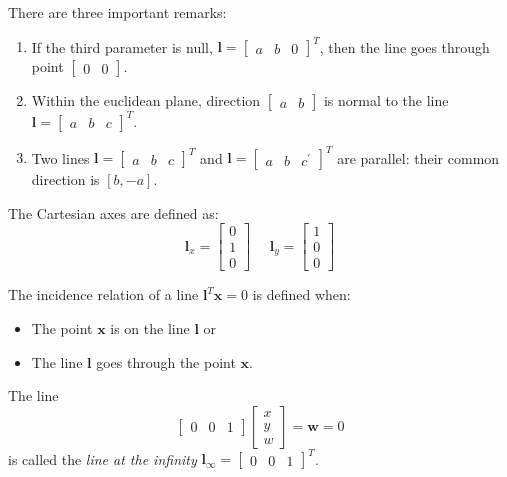 \documentclass[12pt, a4paper]{report}
\newtheorem[style=M,bodystyle=\normalfont]{theorem}{Theorem}
\newtheorem[style=M,bodystyle=\normalfont]{corollary}{Corollary}
\newtheorem[style=M,bodystyle=\normalfont]{lemma}{Lemma}
\newtheorem[style=M,bodystyle=\normalfont]{definition}{Definition}
\begin{document}
    There are three important remarks: 
    \begin{enumerate}
        \item If the third parameter is null, ${\textbf{l}=\begin{bmatrix} a & b & 0 \end{bmatrix}}^T$, then the line goes through point $\begin{bmatrix} 0 & 0 \end{bmatrix}$. 
        \item Within the euclidean plane, direction $\begin{bmatrix} a & b \end{bmatrix}$ is normal to the line \\ ${\textbf{l}=\begin{bmatrix} a & b & c \end{bmatrix}}^T$. 
        \item Two lines ${\textbf{l}=\begin{bmatrix} a & b & c \end{bmatrix}}^T$ and ${\textbf{l}=\begin{bmatrix} a & b & c^{'} \end{bmatrix}}^T$ are parallel: their common 
            direction is $[b,-a]$. 
    \end{enumerate}
    \begin{example}
        The Cartesian axes are defined as: 
        \[\textbf{l}_x=\begin{bmatrix} 0 \\ 1 \\ 0 \end{bmatrix} \:\:\:\:\:\: \textbf{l}_y=\begin{bmatrix} 1 \\ 0 \\ 0 \end{bmatrix}\]
    \end{example}
    The incidence relation of a line $\textbf{l}^T\textbf{x}=0$ is defined when: 
    \begin{itemize}
        \item The point $\textbf{x}$ is on the line $\textbf{l}$ or
        \item The line $\textbf{l}$ goes through the point $\textbf{x}$. 
    \end{itemize}
    \begin{definition}
        The line \[\begin{bmatrix} 0 & 0 & 1 \end{bmatrix} \begin{bmatrix} x \\ y \\ w \end{bmatrix}=\textbf{w}=0\] is called the \emph{line at the infinity} $\textbf{l}_{\infty}={\begin{bmatrix} 0 & 0 & 1 \end{bmatrix}}^T$. 
    \end{definition}
\end{document}
